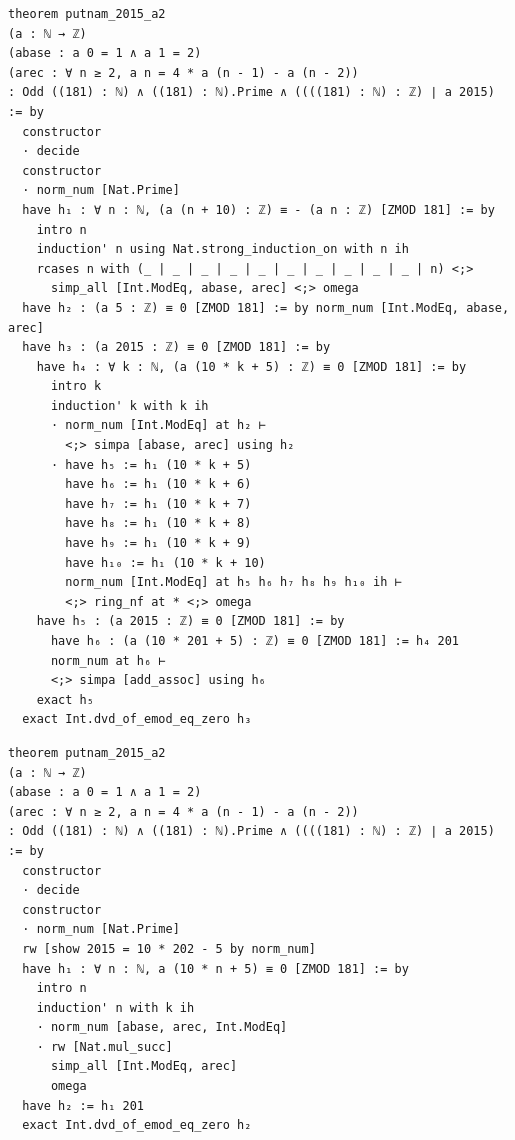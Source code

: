 \begin{tcolorbox}[colback=lightblue, boxrule=0pt, arc=5pt, outer arc=5pt, after skip=10pt plus 2pt]
\begin{minipage}[t]{0.99\textwidth}
\begin{lstlisting}[caption={Original Proof (Length 324)}, language=lean, breaklines=true, style=mystyle]
theorem putnam_2015_a2
(a : ℕ → ℤ)
(abase : a 0 = 1 ∧ a 1 = 2)
(arec : ∀ n ≥ 2, a n = 4 * a (n - 1) - a (n - 2))
: Odd ((181) : ℕ) ∧ ((181) : ℕ).Prime ∧ ((((181) : ℕ) : ℤ) ∣ a 2015) := by
  constructor
  · decide
  constructor
  · norm_num [Nat.Prime]
  have h₁ : ∀ n : ℕ, (a (n + 10) : ℤ) ≡ - (a n : ℤ) [ZMOD 181] := by
    intro n
    induction' n using Nat.strong_induction_on with n ih
    rcases n with (_ | _ | _ | _ | _ | _ | _ | _ | _ | _ | n) <;>
      simp_all [Int.ModEq, abase, arec] <;> omega
  have h₂ : (a 5 : ℤ) ≡ 0 [ZMOD 181] := by norm_num [Int.ModEq, abase, arec]
  have h₃ : (a 2015 : ℤ) ≡ 0 [ZMOD 181] := by
    have h₄ : ∀ k : ℕ, (a (10 * k + 5) : ℤ) ≡ 0 [ZMOD 181] := by
      intro k
      induction' k with k ih
      · norm_num [Int.ModEq] at h₂ ⊢
        <;> simpa [abase, arec] using h₂
      · have h₅ := h₁ (10 * k + 5)
        have h₆ := h₁ (10 * k + 6)
        have h₇ := h₁ (10 * k + 7)
        have h₈ := h₁ (10 * k + 8)
        have h₉ := h₁ (10 * k + 9)
        have h₁₀ := h₁ (10 * k + 10)
        norm_num [Int.ModEq] at h₅ h₆ h₇ h₈ h₉ h₁₀ ih ⊢
        <;> ring_nf at * <;> omega
    have h₅ : (a 2015 : ℤ) ≡ 0 [ZMOD 181] := by
      have h₆ : (a (10 * 201 + 5) : ℤ) ≡ 0 [ZMOD 181] := h₄ 201
      norm_num at h₆ ⊢
      <;> simpa [add_assoc] using h₆
    exact h₅
  exact Int.dvd_of_emod_eq_zero h₃
\end{lstlisting}
\end{minipage}
\begin{minipage}[t]{0.99\textwidth}
\begin{lstlisting}[caption={Simplified Proof (Length 82)}, language=lean, breaklines=true, style=mystyle]
theorem putnam_2015_a2
(a : ℕ → ℤ)
(abase : a 0 = 1 ∧ a 1 = 2)
(arec : ∀ n ≥ 2, a n = 4 * a (n - 1) - a (n - 2))
: Odd ((181) : ℕ) ∧ ((181) : ℕ).Prime ∧ ((((181) : ℕ) : ℤ) ∣ a 2015) := by
  constructor
  · decide
  constructor
  · norm_num [Nat.Prime]
  rw [show 2015 = 10 * 202 - 5 by norm_num]
  have h₁ : ∀ n : ℕ, a (10 * n + 5) ≡ 0 [ZMOD 181] := by
    intro n
    induction' n with k ih
    · norm_num [abase, arec, Int.ModEq]
    · rw [Nat.mul_succ]
      simp_all [Int.ModEq, arec]
      omega
  have h₂ := h₁ 201
  exact Int.dvd_of_emod_eq_zero h₂
\end{lstlisting}
\end{minipage}
\end{tcolorbox}

